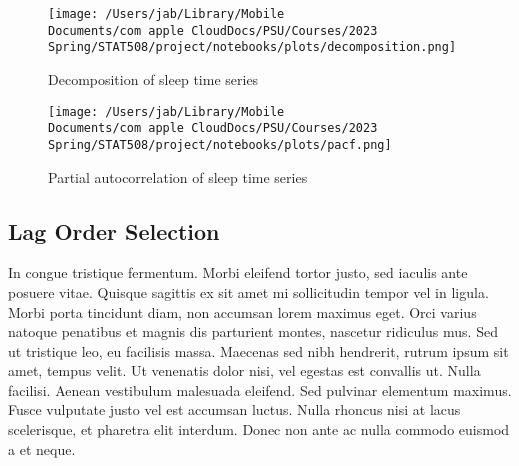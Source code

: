 \documentclass{article}
\begin{document}
\begin{figure}[hb]
\centering
  \texttt{[image: /Users/jab/Library/Mobile Documents/com~apple~CloudDocs/PSU/Courses/2023 Spring/STAT508/project/notebooks/plots/decomposition.png]}
\caption{Decomposition of sleep time series}
\label{Decomposition}
\end{figure}

\begin{figure}[hb]
\centering
  \texttt{[image: /Users/jab/Library/Mobile Documents/com~apple~CloudDocs/PSU/Courses/2023 Spring/STAT508/project/notebooks/plots/pacf.png]}
\caption{Partial autocorrelation of sleep time series}
\label{PACF}
\end{figure}

\hypertarget{lag-order-selection}{%
\subsection{Lag Order Selection}\label{lag-order-selection}}

In congue tristique fermentum. Morbi eleifend tortor justo, sed iaculis
ante posuere vitae. Quisque sagittis ex sit amet mi sollicitudin tempor
vel in ligula. Morbi porta tincidunt diam, non accumsan lorem maximus
eget. Orci varius natoque penatibus et magnis dis parturient montes,
nascetur ridiculus mus. Sed ut tristique leo, eu facilisis massa.
Maecenas sed nibh hendrerit, rutrum ipsum sit amet, tempus velit. Ut
venenatis dolor nisi, vel egestas est convallis ut. Nulla facilisi.
Aenean vestibulum malesuada eleifend. Sed pulvinar elementum maximus.
Fusce vulputate justo vel est accumsan luctus. Nulla rhoncus nisi at
lacus scelerisque, et pharetra elit interdum. Donec non ante ac nulla
commodo euismod a et neque.
\end{document}
